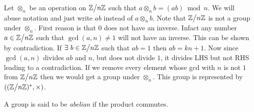 \begin{example}
  Let $\otimes_n$ be an operation on $\Z\bign/n\Z$ such that $a\otimes_n b = (ab)\bmod n$. We will abuse notation and just write $ab$ instead of $a\otimes_n b$. Note that $\Z\bign/n\Z$ is not a group under $\otimes_n$. First reason is that $0$ does not have an inverse. Infact any number $a\in \Z\bign/n\Z$ such that $\gcd(a,n)\neq 1$ will not have an inverse. This can be shown by contradiction. If $\exists\ b\in \Z\bign/n\Z $ such that $ab = 1$ then $ab = kn + 1$. Now since $\gcd(a,n)$ divides $ab$ and $n$, but does not divide $1$, it divides LHS but not RHS leading to a contradiction. If we remove every element whose gcd with $n$ is not $1$ from $ \Z\bign/n\Z$ then we would get a group under $\otimes_n$. This group is represented by $((\Z\bign/n\Z)^*, \times)$.
\end{example}
\begin{definition}
  A group is said to be \textit{abelian} if the product commutes.
\end{definition}
